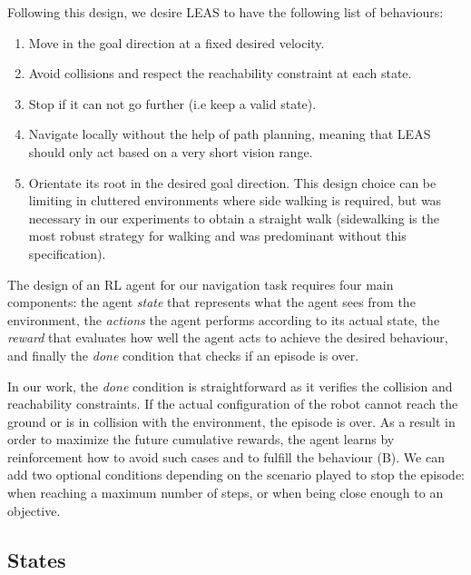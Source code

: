 Following this design, we desire LEAS to have the following list of behaviours:
\begin{enumerate}[label=(\Alph*)]
  \item Move in the goal direction at a fixed desired velocity.
  \item Avoid collisions and respect the reachability constraint at each state. 
  \item Stop if it can not go further (i.e keep a valid state).
  \item Navigate locally without the help of path planning, meaning that LEAS should only act based on a very short vision range.
  \item Orientate its root in the desired goal direction. This design choice can be limiting in cluttered environments where side walking is required, but was necessary in our experiments to obtain a straight walk (sidewalking is the most robust strategy for walking and was predominant without this specification).
\label{list:leas:specifications}
\end{enumerate}

The design of an RL agent for our navigation task requires four main components: 
the agent \textit{state} that represents what the agent sees from the environment, the \textit{actions} the agent performs according to its actual state, the \textit{reward} that evaluates how well the agent acts to achieve the desired behaviour, and finally the \textit{done} condition that checks if an episode is over.

In our work, the \textit{done} condition is straightforward as it verifies the collision and reachability constraints. If the actual configuration of the robot cannot reach the ground or is in collision with the environment, the episode is over. 
As a result in order to maximize the future cumulative rewards, the agent learns by reinforcement how to avoid such cases and to fulfill the behaviour (B). 
We can add two optional conditions depending on the scenario played to stop the episode: when reaching a maximum number of steps, or when being close enough to an objective.





\subsection{States\label{subsubsec:states}}

